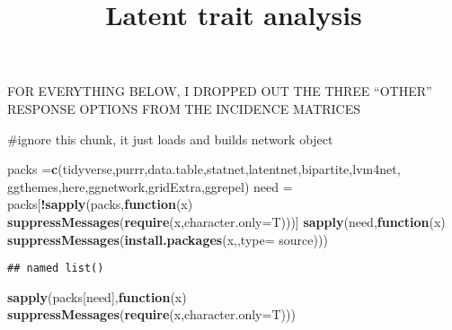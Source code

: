 \documentclass[
]{article}
\title{Latent trait analysis}
\author{}
\date{\vspace{-2.5em}}
\newenvironment{Shaded}{\begin{snugshade}}{\end{snugshade}}
\newcommand{\ControlFlowTok}[1]{\textcolor[rgb]{0.13,0.29,0.53}{\textbf{#1}}}
\newcommand{\DataTypeTok}[1]{\textcolor[rgb]{0.13,0.29,0.53}{#1}}
\newcommand{\KeywordTok}[1]{\textcolor[rgb]{0.13,0.29,0.53}{\textbf{#1}}}
\newcommand{\NormalTok}[1]{#1}
\newcommand{\OperatorTok}[1]{\textcolor[rgb]{0.81,0.36,0.00}{\textbf{#1}}}
\newcommand{\StringTok}[1]{\textcolor[rgb]{0.31,0.60,0.02}{#1}}
\begin{document}
\maketitle

FOR EVERYTHING BELOW, I DROPPED OUT THE THREE ``OTHER'' RESPONSE OPTIONS
FROM THE INCIDENCE MATRICES

\#ignore this chunk, it just loads and builds network object

\begin{Shaded}
\begin{Highlighting}[]
\NormalTok{packs =}\KeywordTok{c}\NormalTok{(}\StringTok{\textquotesingle{}tidyverse\textquotesingle{}}\NormalTok{,}\StringTok{\textquotesingle{}purrr\textquotesingle{}}\NormalTok{,}\StringTok{\textquotesingle{}data.table\textquotesingle{}}\NormalTok{,}\StringTok{\textquotesingle{}statnet\textquotesingle{}}\NormalTok{,}\StringTok{\textquotesingle{}latentnet\textquotesingle{}}\NormalTok{,}\StringTok{\textquotesingle{}bipartite\textquotesingle{}}\NormalTok{,}\StringTok{\textquotesingle{}lvm4net\textquotesingle{}}\NormalTok{,}
         \StringTok{\textquotesingle{}ggthemes\textquotesingle{}}\NormalTok{,}\StringTok{\textquotesingle{}here\textquotesingle{}}\NormalTok{,}\StringTok{\textquotesingle{}ggnetwork\textquotesingle{}}\NormalTok{,}\StringTok{\textquotesingle{}gridExtra\textquotesingle{}}\NormalTok{,}\StringTok{\textquotesingle{}ggrepel\textquotesingle{}}\NormalTok{)}
\NormalTok{need =}\StringTok{ }\NormalTok{packs[}\OperatorTok{!}\KeywordTok{sapply}\NormalTok{(packs,}\ControlFlowTok{function}\NormalTok{(x) }\KeywordTok{suppressMessages}\NormalTok{(}\KeywordTok{require}\NormalTok{(x,}\DataTypeTok{character.only=}\NormalTok{T)))]}
\KeywordTok{sapply}\NormalTok{(need,}\ControlFlowTok{function}\NormalTok{(x) }\KeywordTok{suppressMessages}\NormalTok{(}\KeywordTok{install.packages}\NormalTok{(x,,}\DataTypeTok{type=} \StringTok{\textquotesingle{}source\textquotesingle{}}\NormalTok{)))}
\end{Highlighting}
\end{Shaded}

\begin{verbatim}
## named list()
\end{verbatim}

\begin{Shaded}
\begin{Highlighting}[]
\KeywordTok{sapply}\NormalTok{(packs[need],}\ControlFlowTok{function}\NormalTok{(x) }\KeywordTok{suppressMessages}\NormalTok{(}\KeywordTok{require}\NormalTok{(x,}\DataTypeTok{character.only=}\NormalTok{T)))}
\end{Highlighting}
\end{Shaded}
\end{document}
